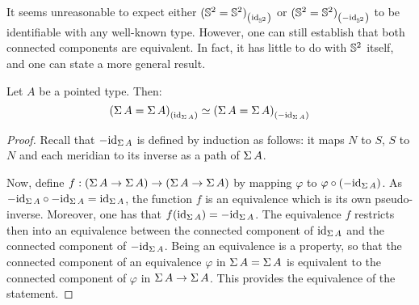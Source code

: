 \documentclass[english,a4]{article}
\renewcommand{\ap}[1]{\left[{#1}\right]}
\begin{document}
It seems unreasonable to expect either ${({{\mathbb S^{2}}} = {{\mathbb S^{2}}})}_{\left(\mathord{\mathrm{id}}_{{\mathbb S^{2}}}\right)}$ or
${({{\mathbb S^{2}}} = {{\mathbb S^{2}}})}_{\left(-\mathord{\mathrm{id}}_{{\mathbb S^{2}}}\right)}$ to be identifiable with any well-known type.
However, one can still establish that both connected components are equivalent.
In fact, it has little to do with ${{\mathbb S^{2}}}$ itself, and one can state a more
general result.
\begin{proposition} \label{prop:equiv-susp-comp}
  Let $A$ be a pointed type. Then:
  \begin{displaymath}
    {(\operatorname{\Sigma}A = \operatorname{\Sigma}A)}_{\left(\mathord{\mathrm{id}}_{\operatorname{\Sigma} A}\right)} \simeq {(\operatorname{\Sigma}A = \operatorname{\Sigma}A)}_{\left(-\mathord{\mathrm{id}}_{\operatorname{\Sigma} A}\right)}
  \end{displaymath}
  \label{prop:sups-components-are-equiv}
\end{proposition}
\begin{proof}
  Recall that $-\mathord{\mathrm{id}}_{\operatorname{\Sigma} A}$ is defined by induction as follows: it maps $N$
  to $S$, $S$ to $N$ and each meridian to its inverse as a path of $\operatorname{\Sigma} A$.

  Now, define $f:{({\operatorname{\Sigma} A} \to {\operatorname{\Sigma}A})} \to ({\operatorname{\Sigma} A} \to {\operatorname{\Sigma}A})$ by mapping
  $\varphi$ to $\varphi\circ(-\mathord{\mathrm{id}}_{\operatorname{\Sigma} A})$.
  As $-\mathord{\mathrm{id}}_{\operatorname{\Sigma} A}\circ -\mathord{\mathrm{id}}_{\operatorname{\Sigma} A} = \mathord{\mathrm{id}}_{\operatorname{\Sigma} A}$, the function $f$ is
  an equivalence which is its own pseudo-inverse. Moreover, one has that
  $f(\mathord{\mathrm{id}}_{\operatorname{\Sigma} A}) = -\mathord{\mathrm{id}}_{\operatorname{\Sigma} A}$.
  The equivalence $f$ restricts then into an equivalence between the connected
  component of $\mathord{\mathrm{id}}_{\operatorname{\Sigma} A}$ and the connected component of $-\mathord{\mathrm{id}}_{\operatorname{\Sigma} A}$. 
  Being an equivalence is a property, so that the connected component of an
  equivalence $\varphi$ in $\operatorname{\Sigma} A = \operatorname{\Sigma} A$ is equivalent to the connected
  component of $\varphi$ in ${\operatorname{\Sigma} A} \to {\operatorname{\Sigma}A}$. This provides the
  equivalence of the statement.
\end{proof}
\end{document}
